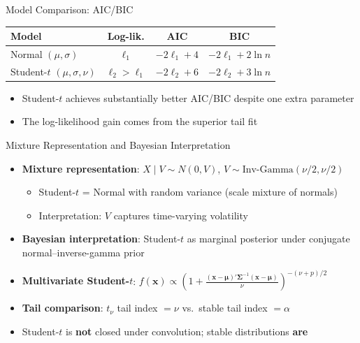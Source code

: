\documentclass[9pt, aspectratio=169, t]{beamer}
\theoremstyle{definition}
\begin{document}
\begin{frame}{Model Comparison: AIC/BIC}
\vspace{0.3cm}
\begin{center}
\renewcommand{\arraystretch}{1.3}
\begin{tabular}{lccc}
\toprule
\textbf{Model} & \textbf{Log-lik.} & \textbf{AIC} & \textbf{BIC} \\
\midrule
Normal $(\mu, \sigma)$ & $\ell_1$ & $-2\ell_1 + 4$ & $-2\ell_1 + 2\ln n$ \\
Student-$t$ $(\mu, \sigma, \nu)$ & $\ell_2 > \ell_1$ & $-2\ell_2 + 6$ & $-2\ell_2 + 3\ln n$ \\
\bottomrule
\end{tabular}
\end{center}
\vspace{0.3cm}
\begin{itemize}
\item Student-$t$ achieves substantially better AIC/BIC despite one extra parameter
\item The log-likelihood gain comes from the superior tail fit
\end{itemize}
\end{frame}

\begin{frame}{Mixture Representation and Bayesian Interpretation}
\begin{itemize}
\item \textbf{Mixture representation}: $X \mid V \sim N(0, V)$, \quad $V \sim \text{Inv-Gamma}(\nu/2, \nu/2)$
\begin{itemize}
\item Student-$t$ = Normal with random variance (scale mixture of normals)
\item Interpretation: $V$ captures time-varying volatility
\end{itemize}
\item \textbf{Bayesian interpretation}: Student-$t$ as marginal posterior under conjugate normal--inverse-gamma prior
\item \textbf{Multivariate Student-$t$}: $f(\bm{x}) \propto \left(1 + \frac{(\bm{x}-\bm{\mu})'\bm{\Sigma}^{-1}(\bm{x}-\bm{\mu})}{\nu}\right)^{-(\nu+p)/2}$
\item \textbf{Tail comparison}: $t_\nu$ tail index $= \nu$ vs.\ stable tail index $= \alpha$
\item Student-$t$ is \textbf{not} closed under convolution; stable distributions \textbf{are}
\end{itemize}
\end{frame}
\end{document}

